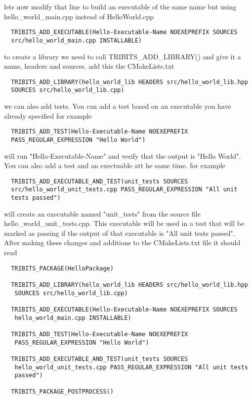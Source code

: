 \documentclass[12pt]{article}
\begin{document}
lets now modify that line to build an executable of the same name but
using hello\_world\_main.cpp instead of HelloWorld.cpp

\begin{verbatim}
  TRIBITS_ADD_EXECUTABLE(Hello-Executable-Name NOEXEPREFIX SOURCES
  src/hello_world_main.cpp INSTALLABLE)
\end{verbatim}

to create a library we need to call TRIBITS\_ADD\_LIBRARY() and give it
a name, headers and sources.  add this the CMakeLists.txt

\begin{verbatim}
  TRIBITS_ADD_LIBRARY(hello_world_lib HEADERS src/hello_world_lib.hpp
  SOURCES src/hello_world_lib.cpp)
\end{verbatim}

we can also add tests.  You can add a test based on an executable you
have already specified for example

\begin{verbatim}
  TRIBITS_ADD_TEST(Hello-Executable-Name NOEXEPREFIX
  PASS_REGULAR_EXPRESSION "Hello World")
\end{verbatim}

will run "Hello-Executable-Name" and verify that the output is "Hello
World".  You can also add a test and an exectuable att he same
time. for example

\begin{verbatim}
  TRIBITS_ADD_EXECUTABLE_AND_TEST(unit_tests SOURCES
  src/hello_world_unit_tests.cpp PASS_REGULAR_EXPRESSION "All unit
  tests passed")
\end{verbatim}

will create an executable named "unit\_tests" from the source file
hello\_world\_unit\_tests.cpp.  This executable will be used in a test
that will be marked as passing if the output of that executable is
"All unit tests passed".  After making these changes and additions to
the CMakeLists.txt file it should read

\begin{verbatim}
  TRIBITS_PACKAGE(HelloPackage)

  TRIBITS_ADD_LIBRARY(hello_world_lib HEADERS src/hello_world_lib.hpp
   SOURCES src/hello_world_lib.cpp)

  TRIBITS_ADD_EXECUTABLE(Hello-Executable-Name NOEXEPREFIX SOURCES
   hello_world_main.cpp INSTALLABLE)

  TRIBITS_ADD_TEST(Hello-Executable-Name NOEXEPREFIX
   PASS_REGULAR_EXPRESSION "Hello World")

  TRIBITS_ADD_EXECUTABLE_AND_TEST(unit_tests SOURCES
   hello_world_unit_tests.cpp PASS_REGULAR_EXPRESSION "All unit tests
   passed")

  TRIBITS_PACKAGE_POSTPROCESS()
\end{verbatim}
\end{document}
